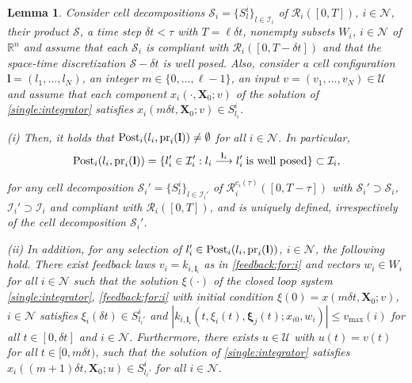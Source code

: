 \documentclass[reqno]{amsart}
\theoremstyle{plain}
\newtheorem{lemma}[thm]{Lemma}
\theoremstyle{definition}
\numberwithin{equation}{section}
\begin{document}
\begin{lemma} \label{lemma:onestep:consistency}
Consider cell decompositions ${\ensuremath{\mathcal{S}}}_i=\{S_l^i\}_{l\in{\ensuremath{\mathcal{I}}}_i}$ of ${\ensuremath{\mathcal{R}}}_i([0,T])$, $i\in{\ensuremath{\mathcal{N}}}$, their product ${\ensuremath{\mathcal{S}}}$, a time step $\delta t<\tau$ with $T=\ell\delta t$, nonempty subsets $W_i$, $i\in{\ensuremath{\mathcal{N}}}$ of ${\ensuremath{\mathbb{R}^{{n}}}}$ and assume that each ${\ensuremath{\mathcal{S}}}_i$ is compliant with  ${\ensuremath{\mathcal{R}}}_i([0,T-\delta t])$ and that the space-time discretization ${\ensuremath{\mathcal{S}}}-\delta t$ is well posed. Also, consider a cell configuration ${\textbf{{l}}}=(l_1,\ldots,l_N)$, an integer $m\in\{0,\ldots,\ell-1\}$, an input $v=(v_1,\ldots,v_N)\in{\ensuremath{\mathcal{U}}}$ and assume that each component $x_i(\cdot,{\textbf{{X}}}_0;v)$ of the solution of \eqref{single:integrator} satisfies $x_i(m\delta t,{\textbf{{X}}}_0;v)\in S_{l_i}^i$. 

\noindent \textit{(i)} Then, it holds that ${\rm Post}_i(l_i,{\rm pr}_i({\textbf{{l}}}))\ne\emptyset$ for all $i\in{\ensuremath{\mathcal{N}}}$. In particular, 
\begin{equation} \label{post:indiv:characterization}
{\rm Post}_i(l_i,{\rm pr}_i({\textbf{{l}}}))=\{l_i'\in{\ensuremath{\mathcal{I}}}_i':l_i\overset{{\textbf{{l}}}_i}{\longrightarrow}l_i'\;\textup{is well posed}\}\subset{\ensuremath{\mathcal{I}}}_i,
\end{equation}

\noindent for any cell decomposition  ${\ensuremath{\mathcal{S}}}_i'=\{S_l^i\}_{l\in{\ensuremath{\mathcal{I}}}_i'}$ of ${\ensuremath{\mathcal{R}}}_i^{c_i(\tau)}([0,T-\tau])$ with ${\ensuremath{\mathcal{S}}}_i'\supset{\ensuremath{\mathcal{S}}}_i$,  ${\ensuremath{\mathcal{I}}}_i'\supset{\ensuremath{\mathcal{I}}}_i$ and compliant with ${\ensuremath{\mathcal{R}}}_i([0,T])$, and is uniquely defined, irrespectively of the cell decomposition ${\ensuremath{\mathcal{S}}}_i'$. 

\noindent \textit{(ii)} In addition, for any selection of $l_i'\in{\rm Post}_i(l_i,{\rm pr}_i({\textbf{{l}}}))$, $i\in{\ensuremath{\mathcal{N}}}$, the following hold. There exist feedback laws $v_i=k_{i,{\textbf{{l}}}_i}$ as in \eqref{feedback:for:i} and vectors $w_i\in W_i$ for all $i\in{\ensuremath{\mathcal{N}}}$ such that the solution $\xi(\cdot)$ of the closed loop system \eqref{single:integrator}, \eqref{feedback:for:i} with initial condition $\xi(0)=x(m\delta t,{\textbf{{X}}}_0;v)$, $i\in{\ensuremath{\mathcal{N}}}$ satisfies $\xi_i(\delta t)\in S_{l_i'}^i$ and $|k_{i,{\textbf{{l}}}_i}(t,\xi_{i}(t),{\ensuremath{\boldsymbol{{\xi}}}}_j(t);x_{i0},w_i)|\le  v_{\max}(i)$ for all $t\in[0,\delta t]$ and $i\in{\ensuremath{\mathcal{N}}}$. Furthermore, there exists $u\in{\ensuremath{\mathcal{U}}}$ with $u(t)=v(t)$ for all $t\in[0,m\delta t)$, such that the solution of \eqref{single:integrator} satisfies $x_i((m+1)\delta t,{\textbf{{X}}}_0;u)\in S_{l_i'}^i$ for all $i\in{\ensuremath{\mathcal{N}}}$.
\end{lemma}
\end{document}
